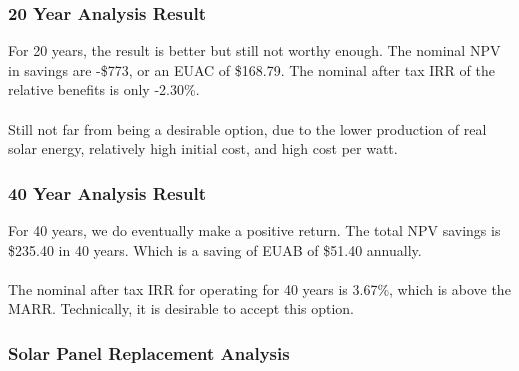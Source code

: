 \documentclass[10pt,letterpaper]{article}
\begin{document}
\subsubsection{20 Year Analysis Result}

For 20 years, the result is better but still not worthy enough. The nominal NPV in savings are -\$773, or an EUAC of \$168.79. The nominal after tax IRR of the relative benefits is only -2.30\%.\\
\\
Still not far from being a desirable option, due to the lower production of real solar energy, relatively high initial cost, and high cost per watt.\\

\subsubsection{40 Year Analysis Result}

For 40 years, we do eventually make a positive return. The total NPV savings is \$235.40 in 40 years. Which is a saving of EUAB of \$51.40 annually.\\
\\
The nominal after tax IRR for operating for 40 years is 3.67\%, which is above the MARR. Technically, it is desirable to accept this option.\\

\subsubsection{Solar Panel Replacement Analysis}
\end{document}
